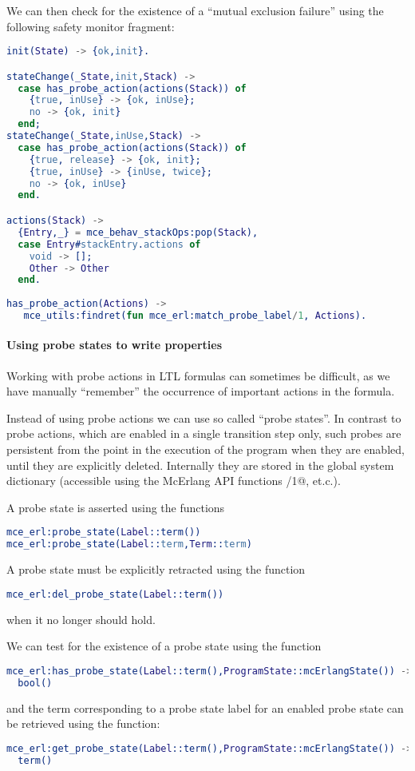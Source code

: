 \documentclass[a4paper]{article}
\begin{document}
We can then check for the existence of a ``mutual exclusion failure''
using the following safety monitor fragment:
\begin{lstlisting}[language=Erlang]
init(State) -> {ok,init}.

stateChange(_State,init,Stack) -> 
  case has_probe_action(actions(Stack)) of
    {true, inUse} -> {ok, inUse};
    no -> {ok, init}
  end;
stateChange(_State,inUse,Stack) ->
  case has_probe_action(actions(Stack)) of
    {true, release} -> {ok, init};
    {true, inUse} -> {inUse, twice};
    no -> {ok, inUse}
  end.

actions(Stack) ->
  {Entry,_} = mce_behav_stackOps:pop(Stack),
  case Entry#stackEntry.actions of
    void -> [];
    Other -> Other
  end.
 
has_probe_action(Actions) ->
   mce_utils:findret(fun mce_erl:match_probe_label/1, Actions).
\end{lstlisting}

\paragraph{Using probe states to write properties}

Working with probe actions in LTL formulas can sometimes be difficult,
as we have manually ``remember'' the occurrence of
important actions in the formula. 

Instead of using probe actions we can use so called ``probe states''.
In contrast to probe actions, which are enabled in a single
transition step only, such probes are persistent from the point in 
the execution of the program when they are enabled, until they 
are explicitly deleted. Internally they are stored in the
global system dictionary (accessible using the McErlang API functions
\lstinline@gget/1@, et.c.).

A probe state is asserted using the functions
\begin{lstlisting}[language=erlang]
mce_erl:probe_state(Label::term())
mce_erl:probe_state(Label::term,Term::term)
\end{lstlisting}

A probe state must be explicitly retracted using the function
\begin{lstlisting}[language=erlang]
mce_erl:del_probe_state(Label::term())
\end{lstlisting}
when it no longer should hold.

We can test for the existence of a probe state using
the function 
\begin{lstlisting}[language=erlang]
mce_erl:has_probe_state(Label::term(),ProgramState::mcErlangState()) ->
  bool()
\end{lstlisting}
and the term corresponding to a probe state label for an enabled probe state
can be retrieved using the function:
\begin{lstlisting}[language=erlang]
mce_erl:get_probe_state(Label::term(),ProgramState::mcErlangState()) ->
  term()
\end{lstlisting}
\end{document}
